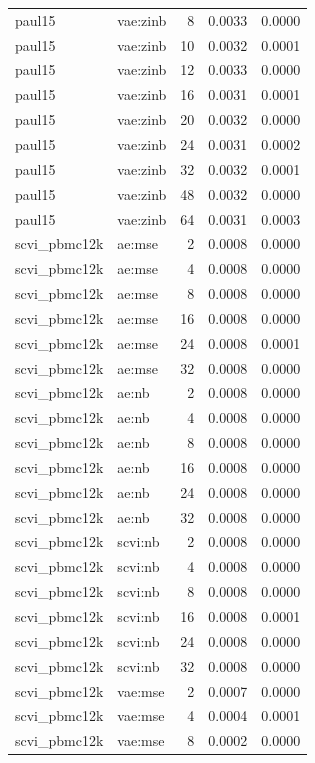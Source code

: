\begin{tabular}{llrrr}
paul15 & vae:zinb & 8 & 0.0033 & 0.0000 \\
paul15 & vae:zinb & 10 & 0.0032 & 0.0001 \\
paul15 & vae:zinb & 12 & 0.0033 & 0.0000 \\
paul15 & vae:zinb & 16 & 0.0031 & 0.0001 \\
paul15 & vae:zinb & 20 & 0.0032 & 0.0000 \\
paul15 & vae:zinb & 24 & 0.0031 & 0.0002 \\
paul15 & vae:zinb & 32 & 0.0032 & 0.0001 \\
paul15 & vae:zinb & 48 & 0.0032 & 0.0000 \\
paul15 & vae:zinb & 64 & 0.0031 & 0.0003 \\
scvi\_pbmc12k & ae:mse & 2 & 0.0008 & 0.0000 \\
scvi\_pbmc12k & ae:mse & 4 & 0.0008 & 0.0000 \\
scvi\_pbmc12k & ae:mse & 8 & 0.0008 & 0.0000 \\
scvi\_pbmc12k & ae:mse & 16 & 0.0008 & 0.0000 \\
scvi\_pbmc12k & ae:mse & 24 & 0.0008 & 0.0001 \\
scvi\_pbmc12k & ae:mse & 32 & 0.0008 & 0.0000 \\
scvi\_pbmc12k & ae:nb & 2 & 0.0008 & 0.0000 \\
scvi\_pbmc12k & ae:nb & 4 & 0.0008 & 0.0000 \\
scvi\_pbmc12k & ae:nb & 8 & 0.0008 & 0.0000 \\
scvi\_pbmc12k & ae:nb & 16 & 0.0008 & 0.0000 \\
scvi\_pbmc12k & ae:nb & 24 & 0.0008 & 0.0000 \\
scvi\_pbmc12k & ae:nb & 32 & 0.0008 & 0.0000 \\
scvi\_pbmc12k & scvi:nb & 2 & 0.0008 & 0.0000 \\
scvi\_pbmc12k & scvi:nb & 4 & 0.0008 & 0.0000 \\
scvi\_pbmc12k & scvi:nb & 8 & 0.0008 & 0.0000 \\
scvi\_pbmc12k & scvi:nb & 16 & 0.0008 & 0.0001 \\
scvi\_pbmc12k & scvi:nb & 24 & 0.0008 & 0.0000 \\
scvi\_pbmc12k & scvi:nb & 32 & 0.0008 & 0.0000 \\
scvi\_pbmc12k & vae:mse & 2 & 0.0007 & 0.0000 \\
scvi\_pbmc12k & vae:mse & 4 & 0.0004 & 0.0001 \\
scvi\_pbmc12k & vae:mse & 8 & 0.0002 & 0.0000 \\

\end{tabular}
